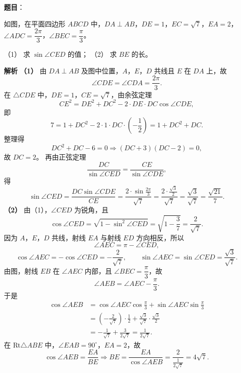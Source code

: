 \begin{answer}


\end{answer}
\begin{answer}

\textbf{题目}：

如图，在平面四边形 $ABCD$ 中，$DA\perp AB$，$DE=1$，$EC=\sqrt7$，$EA=2$，$\angle ADC=\dfrac{2\pi}3$，$\angle BEC=\dfrac\pi3$。
\nopagebreak[4]
\begin{center}\end{center}
\nopagebreak[4]
（1） 求 $\sin\angle CED$ 的值；
（2） 求 $BE$ 的长。

\textbf{解析}
\textbf{（1）} 由 $DA\perp AB$ 及图中位置，$A$，$E$，$D$ 共线且 $E$ 在 $DA$ 上，故
\nopagebreak[4]
\[\angle CDE=\angle CDA=\frac{2\pi}3 .\]
在 $\triangle CDE$ 中，$DE=1$，$CE=\sqrt7$，由余弦定理
\nopagebreak[4]
\[CE^2=DE^2+DC^2-2\cdot DE\cdot DC\cos\angle CDE,\]
即
\nopagebreak[4]
\[7=1+DC^2-2\cdot1\cdot DC\cdot\left(-\frac12\right)=1+DC^2+DC .\]
整理得
\nopagebreak[4]
\[DC^2+DC-6=0\Longrightarrow(DC+3)(DC-2)=0,\]
故 $DC=2$。
再由正弦定理
\nopagebreak[4]
\[\frac{DC}{\sin\angle CED}=\frac{CE}{\sin\angle CDE},\]
得
\nopagebreak[4]
\[\sin\angle CED=\frac{DC\sin\angle CDE}{CE}
=\frac{2\cdot\sin\frac{2\pi}3}{\sqrt7}
=\frac{2\cdot\frac{\sqrt3}2}{\sqrt7}
=\frac{\sqrt3}{\sqrt7}=\frac{\sqrt{21}}7 .\]
\textbf{（2）} 由（1），$\angle CED$ 为锐角，且
\nopagebreak[4]
\[\cos\angle CED=\sqrt{1-\sin^2\angle CED}
=\sqrt{1-\frac37}=\frac2{\sqrt7}.\]
因为 $A$，$E$，$D$ 共线，射线 $EA$ 与射线 $ED$ 方向相反，所以
\nopagebreak[4]
\[\angle AEC=\pi-\angle CED,\]
\nopagebreak[4]
\[\cos\angle AEC=-\cos\angle CED=-\frac2{\sqrt7},\qquad
\sin\angle AEC=\sin\angle CED=\frac{\sqrt3}{\sqrt7}.\]
由图，射线 $EB$ 在 $\angle AEC$ 内部，且 $\angle BEC=\dfrac\pi3$，故
\nopagebreak[4]
\[\angle AEB=\angle AEC-\frac\pi3 .\]
于是
\nopagebreak[4]
\[\begin{aligned}
\cos\angle AEB
&=\cos\angle AEC\cos\frac\pi3+\sin\angle AEC\sin\frac\pi3\\
&=\left(-\frac2{\sqrt7}\right)\cdot\frac12+\frac{\sqrt3}{\sqrt7}\cdot\frac{\sqrt3}2\\
&=-\frac1{\sqrt7}+\frac3{2\sqrt7}=\frac1{2\sqrt7}.
\end{aligned}\]
在 Rt$\triangle ABE$ 中，$\angle EAB=90^\circ$，$EA=2$，故
\nopagebreak[4]
\[\cos\angle AEB=\frac{EA}{BE}\Longrightarrow
BE=\frac{EA}{\cos\angle AEB}=\frac{2}{\frac1{2\sqrt7}}=4\sqrt7 .\]


\end{answer}
